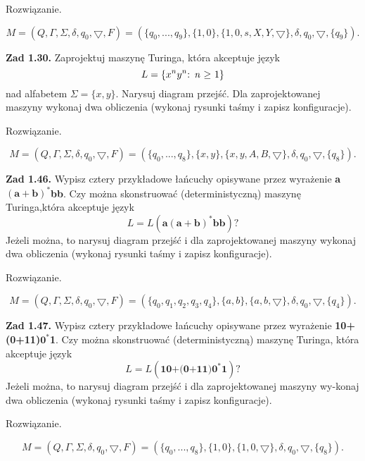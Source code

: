\documentclass[12pt]{article}
\begin{document}
 Rozwiązanie.
 
\[M=(Q,\Gamma,\Sigma,\delta,q_0,\bigtriangledown,F)=(\{q_0,...,q_9\},\{1,0\},\{1,0,s,X,Y,\bigtriangledown\},\delta,q_0,\bigtriangledown,\{q_9\}).\]

\newpage

\noindent\textbf{Zad 1.30.} Zaprojektuj maszynę Turinga, która akceptuje język
\[L=\{\text{$x^ny^n$: \textit{n} $\geq$ 1}\}\]
nad alfabetem $\Sigma=\{x,y\}$. Narysuj diagram przejść. Dla zaprojektowanej maszyny wykonaj dwa obliczenia (wykonaj rysunki taśmy i zapisz konfiguracje).

 Rozwiązanie.
 
\[M=(Q,\Gamma,\Sigma,\delta,q_0,\bigtriangledown,F)=(\{q_0,...,q_8\},\{x,y\},\{x,y,A,B,\bigtriangledown\},\delta,q_0,\bigtriangledown,\{q_8\}).\]

\newpage

\noindent\textbf{Zad 1.46.} Wypisz cztery przykładowe łańcuchy opisywane przez wyrażenie \textbf{a}$(\textbf{a}+\textbf{b})^*$\textbf{bb}. Czy można skonstruować (deterministyczną) maszynę Turinga,która akceptuje język
\[L=L(\textbf{a}(\textbf{a}+\textbf{b})^*\textbf{bb})?\]
Jeżeli można, to narysuj diagram przejść i dla zaprojektowanej maszyny wykonaj dwa obliczenia (wykonaj rysunki taśmy i zapisz konfiguracje).

 Rozwiązanie.
 
\[M=(Q,\Gamma,\Sigma,\delta,q_0,\bigtriangledown,F)=(\{q_0,q_1,q_2,q_3,q_4\},\{a,b\},\{a,b,\bigtriangledown\},\delta,q_0,\bigtriangledown,\{q_4\}).\]

\newpage

\noindent\textbf{Zad 1.47.} Wypisz cztery przykładowe łańcuchy opisywane przez wyrażenie \textbf{10+(0+11)$\textbf{0}^*$1}. Czy można skonstruować (deterministyczną) maszynę Turinga, która akceptuje język
\[L=L(\textbf{10+(0+11)$\textbf{0}^*$1})?\]
Jeżeli można, to narysuj diagram przejść i dla zaprojektowanej maszyny wy-konaj dwa obliczenia (wykonaj rysunki taśmy i zapisz konfiguracje).

 Rozwiązanie.
 
\[M=(Q,\Gamma,\Sigma,\delta,q_0,\bigtriangledown,F)=(\{q_0,...,q_8\},\{1,0\},\{1,0,\bigtriangledown\},\delta,q_0,\bigtriangledown,\{q_8\}).\]

\newpage

\end{document}
